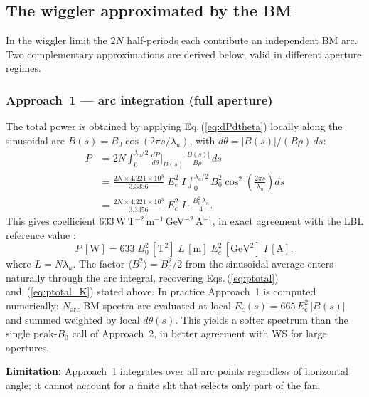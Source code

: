 \documentclass[11pt,a4paper]{article}
\begin{document}
\subsection{The wiggler approximated by the BM}
\label{sec:wigBM}

In the wiggler limit the $2N$ half-periods each contribute an independent BM arc.
Two complementary approximations are derived below, valid in different aperture regimes.

\subsubsection*{Approach~1 --- arc integration (full aperture)}

The total power is obtained by applying Eq.\,(\ref{eq:dPdtheta}) locally along the
sinusoidal arc $B(s) = B_0\cos(2\pi s/\lambda_u)$, with $d\theta = |B(s)|/(B\rho)\,ds$:
\begin{align}
  P &= 2N \int_0^{\lambda_u/2}
       \frac{dP}{d\theta}\bigg|_{B(s)} \frac{|B(s)|}{B\rho}\,ds
  \nonumber\\
    &= \frac{2N \times 4.221\times10^3}{3.3356}\; E_e^2\; I
       \int_0^{\lambda_u/2} B_0^2\cos^2\!\left(\frac{2\pi s}{\lambda_u}\right)ds
  \nonumber\\
    &= \frac{2N \times 4.221\times10^3}{3.3356}\; E_e^2\; I \cdot
       \frac{B_0^2\,\lambda_u}{4}.
  \label{eq:approach1}
\end{align}
This gives coefficient $633$\,W\,T$^{-2}$\,m$^{-1}$\,GeV$^{-2}$\,A$^{-1}$, in
exact agreement with the LBL reference value \cite{kim1989}:
\begin{equation}
  \boxed{P\,[\text{W}] = 633\; B_0^2\,[\text{T}^2]\; L\,[\text{m}]\;
         E_e^2\,[\text{GeV}^2]\; I\,[\text{A}]},
  \label{eq:P633}
\end{equation}
where $L = N\lambda_u$.  The factor $\langle B^2\rangle = B_0^2/2$ from the sinusoidal
average enters naturally through the arc integral, recovering Eqs.\,(\ref{eq:ptotal})
and~(\ref{eq:ptotal_K}) stated above.
In practice Approach~1 is computed numerically: $N_\text{arc}$ BM spectra are evaluated
at local $E_c(s) = 665\,E_e^2\,|B(s)|$ and summed weighted by local $d\theta(s)$.
This yields a softer spectrum than the single peak-$B_0$ call of Approach~2, in better
agreement with WS for large apertures.

\textbf{Limitation:} Approach~1 integrates over all arc points regardless of horizontal
angle; it cannot account for a finite slit that selects only part of the fan.
\end{document}
